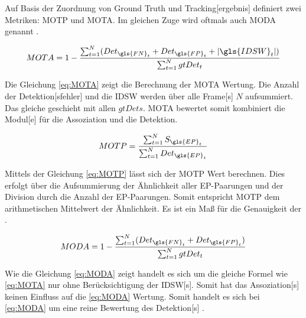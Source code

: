 Auf Basis der Zuordnung von \gls{Ground Truth} und \gls{Tracking}[ergebnis] definiert \cite{CLEAR.2008} zwei Metriken: \gls{MOTP} und \gls{MOTA}. Im gleichen Zuge wird oftmals auch \gls{MODA} genannt \cite{Kasturi.2009}. 

\begin{equation}
    \label{eq:MOTA}
    MOTA = 1-\frac{\sum_{t=1}^{N} (Det_{\gls{FN}_{t}}+Det_{\gls{FP}_{t}}+|\gls{IDSW}_{t}|)}{\sum_{t=1}^{N}gtDet_t}
\end{equation}

Die Gleichung \ref{eq:MOTA} zeigt die Berechnung der \gls{MOTA} Wertung. Die Anzahl der \gls{Detektion}[sfehler] und die \gls{IDSW} werden über alle \gls{Frame}[s] \(N\) aufsummiert. Das gleiche geschieht mit allen \(gtDets\). \gls{MOTA} bewertet somit kombiniert die \gls{Modul}[e] für die \gls{Assoziation} und die \gls{Detektion}. 

\begin{equation}
    \label{eq:MOTP}
    MOTP = \frac{\sum_{t=1}^{N}S_{\gls{EP}_t}}{\sum_{t=1}^{N}Det_{\gls{EP}_t}}
\end{equation}

Mittels der Gleichung \ref{eq:MOTP} lässt sich der \gls{MOTP} Wert berechnen. Dies erfolgt über die Aufsummierung der Ähnlichkeit aller \gls{EP}-Paarungen und der Division durch die Anzahl der \gls{EP}-Paarungen. Somit entspricht \gls{MOTP} dem arithmetischen Mittelwert der Ähnlichkeit. Es ist ein Maß für die Genauigkeit der .

\begin{equation}
    \label{eq:MODA}
    MODA =  1-\frac{\sum_{t=1}^{N} (Det_{\gls{FN}_{t}}+Det_{\gls{FP}_{t}})}{\sum_{t=1}^{N}gtDet_t}
\end{equation}

Wie die Gleichung \ref{eq:MODA} zeigt handelt es sich um die gleiche Formel wie \ref{eq:MOTA} nur ohne Berücksichtigung der \gls{IDSW}[s]. Somit hat das \gls{Assoziation}[s] keinen Einfluss auf die \ref{eq:MODA} Wertung. Somit handelt es sich bei \ref{eq:MODA} um eine reine Bewertung des \gls{Detektion}[s] \cite{CLEAR.2008, HOTA, Kasturi.2009}.



